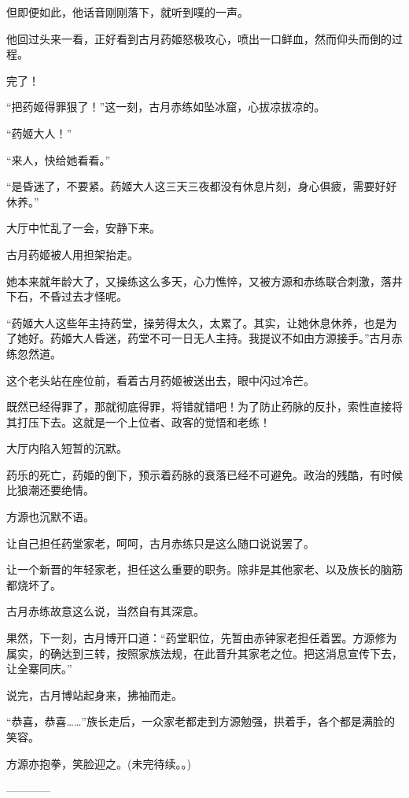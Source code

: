 \begin{this_body}
但即便如此，他话音刚刚落下，就听到噗的一声。

他回过头来一看，正好看到古月药姬怒极攻心，喷出一口鲜血，然而仰头而倒的过程。

完了！

“把药姬得罪狠了！”这一刻，古月赤练如坠冰窟，心拔凉拔凉的。

“药姬大人！”

“来人，快给她看看。”

“是昏迷了，不要紧。药姬大人这三天三夜都没有休息片刻，身心俱疲，需要好好休养。”

大厅中忙乱了一会，安静下来。

古月药姬被人用担架抬走。

她本来就年龄大了，又操练这么多天，心力憔悴，又被方源和赤练联合刺激，落井下石，不昏过去才怪呢。

“药姬大人这些年主持药堂，操劳得太久，太累了。其实，让她休息休养，也是为了她好。药姬大人昏迷，药堂不可一日无人主持。我提议不如由方源接手。”古月赤练忽然道。

这个老头站在座位前，看着古月药姬被送出去，眼中闪过冷芒。

既然已经得罪了，那就彻底得罪，将错就错吧！为了防止药脉的反扑，索性直接将其打压下去。这就是一个上位者、政客的觉悟和老练！

大厅内陷入短暂的沉默。

药乐的死亡，药姬的倒下，预示着药脉的衰落已经不可避免。政治的残酷，有时候比狼潮还要绝情。

方源也沉默不语。

让自己担任药堂家老，呵呵，古月赤练只是这么随口说说罢了。

让一个新晋的年轻家老，担任这么重要的职务。除非是其他家老、以及族长的脑筋都烧坏了。

古月赤练故意这么说，当然自有其深意。

果然，下一刻，古月博开口道：“药堂职位，先暂由赤钟家老担任着罢。方源修为属实，的确达到三转，按照家族法规，在此晋升其家老之位。把这消息宣传下去，让全寨同庆。”

说完，古月博站起身来，拂袖而走。

“恭喜，恭喜……”族长走后，一众家老都走到方源勉强，拱着手，各个都是满脸的笑容。

方源亦抱拳，笑脸迎之。(未完待续。。)

------------

\end{this_body}

